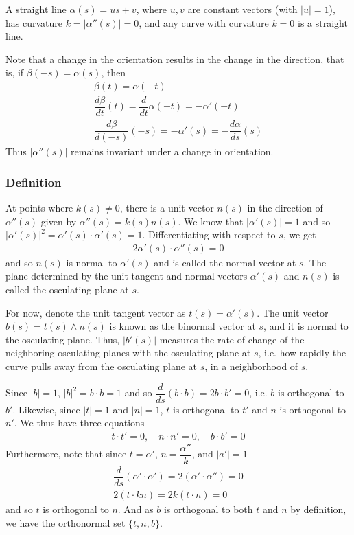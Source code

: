 \documentclass{article}
\begin{document}
	A straight line $\alpha(s) = us + v$, where $u, v$ are constant vectors (with $|u| = 1$), has curvature $k = |\alpha''(s)| = 0$, and any curve with curvature $k = 0$ is a straight line.
	
	Note that a change in the orientation results in the change in the direction, that is, if $\beta(-s) = \alpha(s)$, then
	\begin{gather*}
		\beta(t) = \alpha(-t) \\
		\dfrac{d \beta}{d t} (t) = \dfrac{d}{d t} \alpha(-t) = -\alpha'(-t) \\
		\dfrac{d \beta}{d (-s)} (-s) = -\alpha'(s) = -\dfrac{d \alpha}{d s} (s)
	\end{gather*}
	Thus $|\alpha''(s)|$ remains invariant under a change in orientation.
	
	\subsubsection*{Definition}
	At points where $k(s) \neq 0$, there is a unit vector $n(s)$ in the direction of $\alpha''(s)$ given by $\alpha''(s) = k(s)n(s)$. We know that $|\alpha'(s)| = 1$ and so $|\alpha'(s)|^2 = \alpha'(s) \cdot \alpha'(s) = 1$. Differentiating with respect to $s$, we get
	\begin{gather*}
		2 \alpha'(s) \cdot \alpha''(s) = 0
	\end{gather*}
	and so $n(s)$ is normal to $\alpha'(s)$ and is called the normal vector at $s$. The plane determined by the unit tangent and normal vectors $\alpha'(s)$ and $n(s)$ is called the osculating plane at $s$.
	
	For now, denote the unit tangent vector as $t(s) = \alpha'(s)$. The unit vector $b(s) = t(s) \wedge n(s)$ is known as the binormal vector at $s$, and it is normal to the osculating plane. Thus, $|b'(s)|$ measures the rate of change of the neighboring osculating planes with the osculating plane at $s$, i.e. how rapidly the curve pulls away from the osculating plane at $s$, in a neighborhood of $s$.
	
	Since $|b| = 1$, $|b|^2 = b \cdot b = 1$ and so $\dfrac{d}{ds} (b \cdot b) = 2b \cdot b' = 0$, i.e. $b$ is orthogonal to $b'$. Likewise, since $|t| = 1$ and $|n| = 1$, $t$ is orthogonal to $t'$ and $n$ is orthogonal to $n'$. We thus have three equations
	\begin{gather*}
		t \cdot t' = 0, \quad n \cdot n' = 0, \quad b \cdot b' = 0
	\end{gather*}
	Furthermore, note that since $t = \alpha'$, $n = \dfrac{\alpha''}{k}$, and $|a'| = 1$
	\begin{gather*}
		\dfrac{d}{ds}(\alpha' \cdot \alpha') = 2 (\alpha' \cdot \alpha'') = 0 \\
		2 (t \cdot kn) = 2k (t \cdot n) = 0
	\end{gather*}
	and so $t$ is orthogonal to $n$. And as $b$ is orthogonal to both $t$ and $n$ by definition, we have the orthonormal set $\{t, n, b\}$.
	
\end{document}
